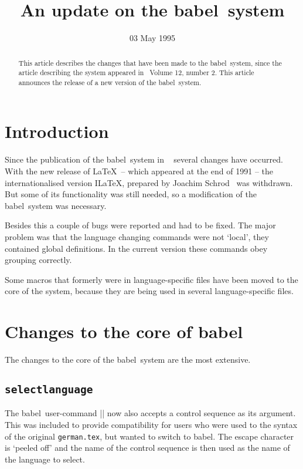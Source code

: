 \documentclass{ltugboat}
\newcommand{\file}[1]{\texttt{#1}}
\newcommand{\babel}{\textsf{babel}}
\newcommand{\bsl}{\protect\bslash}
\begin{document}
\title{An update on the \babel\ system}
\address{PTT Research Neher laboratories\\
         P.O. Box 421\\
         2260 AK Leidschendam}
\date{03 May 1995}
\maketitle

\begin{abstract}
  This article describes the changes that have been made to the
  \babel\ system, since the article describing the system appeared in
  \TUB\ Volume 12, number 2. This article announces the release of a
  new version of the \babel\ system.
\end{abstract}

\section{Introduction}

Since the publication of the \babel\ system in \TUB~\cite{bab} several
changes have occurred. With the new release of \LaTeX\ -- which
appeared at the end of 1991 -- the internationalised version I\LaTeX,
prepared by Joachim Schrod~\cite{ilatex} was withdrawn. But some of
its functionality was still needed, so a modification of the \babel\
system was necessary.

Besides this a couple of bugs were reported and had to be fixed. The
major problem was that the language changing commands were not
`local', they contained global definitions. In the current version
these commands obey grouping correctly.

Some macros that formerly were in language-specific files have been
moved to the core of the system, because they are being used in
several language-specific files.

\section{Changes to the core of \babel}

The changes to the core of the \babel\ system are the most extensive.

\subsection*{{\tt\bsl selectlanguage}}
The \babel\ user-command |\selectlanguage| now also accepts a control
sequence as its argument. This was included to provide compatibility
for users who were used to the syntax of the original
\file{german.tex}, but wanted to switch to \babel.  The escape
character is `peeled off' and the name of the control sequence is then
used as the name of the language to select.
\end{document}
